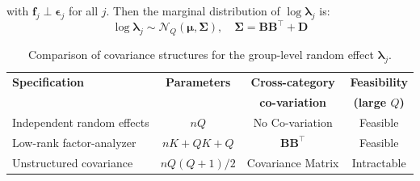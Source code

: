 \documentclass[]{report}
\theoremstyle{definition}
\newtheorem{remark}{Remark}
\newtheorem{lemma}{Lemma}
\begin{document}
with $\boldsymbol{f}_{j}\perp \boldsymbol{\epsilon}_{j}$ for all $j$. Then the marginal distribution of $\log \boldsymbol{\lambda}_{j}$ is:
\begin{equation}
		\log \boldsymbol{\lambda}_{j}\sim \mathcal{N}_{Q}(\boldsymbol{\mu}, \boldsymbol{\Sigma}),\quad \boldsymbol{\Sigma}=\mathbf{B}\mathbf{B}^{\top}+\mathbf{D}
\end{equation}
\begin{table}[h]
\centering
\caption{Comparison of covariance structures for the group-level 
random effect $\boldsymbol{\lambda}_j$.}
\label{tab:cov_comparison}
\begin{tabular}{lccc}
\toprule
\textbf{Specification} & \textbf{Parameters} & \textbf{Cross-category} & \textbf{Feasibility} \\
                       &                     & \textbf{co-variation}   & \textbf{(large $Q$)} \\
\midrule
Independent random effects  
  & $nQ$& No Co-variation& Feasible\\[6pt]
Low-rank factor-analyzer& $nK + QK + Q$& $\mathbf{BB}^{\top}$& Feasible\\[6pt]
Unstructured covariance  
  & $nQ(Q+1)/2$& Covariance Matrix& Intractable\\
\bottomrule
\end{tabular}

\end{table}

    
\end{document}

